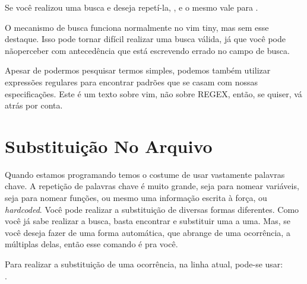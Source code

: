 Se você realizou uma busca e deseja repetí-la, \vimcommand{//}, e o mesmo vale para .

O mecanismo de busca funciona normalmente no vim tiny, mas sem esse destaque.
Isso pode tornar difícil realizar uma busca válida, já que você pode nãoperceber com antecedência
que está escrevendo errado no campo de busca.


Apesar de podermos pesquisar termos simples, podemos também utilizar expressões regulares para encontrar padrões que se casam com nossas especificações.
Este é um texto sobre vim, não sobre REGEX, então, se quiser, vá atrás por conta.

\section{Substituição No Arquivo}
Quando estamos programando temos o costume de usar vastamente palavras chave.
A repetição de palavras chave é muito grande, seja para nomear variáveis, seja para nomear funções,
ou mesmo uma informação escrita à força, ou \textit{hardcoded}.
Você pode realizar a substituição de diversas formas diferentes.
Como você já sabe realizar a busca, basta encontrar e substituir uma a uma.
Mas, se você deseja fazer de uma forma automática, que abrange de uma ocorrência, a múltiplas delas, então esse comando é pra você.

Para realizar a substituição de uma ocorrência, na linha atual, pode-se usar:\\
.

